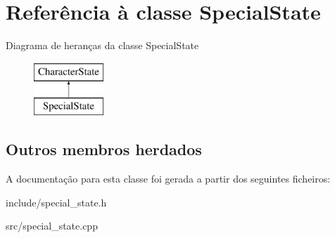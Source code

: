 \hypertarget{classSpecialState}{}\section{Referência à classe Special\+State}
\label{classSpecialState}
Diagrama de heranças da classe Special\+State\begin{figure}[H]
\begin{center}
\leavevmode
\includegraphics[height=2.000000cm]{classSpecialState}
\end{center}
\end{figure}
\subsection*{Outros membros herdados}


A documentação para esta classe foi gerada a partir dos seguintes ficheiros\+:\begin{DoxyCompactItemize}
\item 
include/special\+\_\+state.\+h\item 
src/special\+\_\+state.\+cpp\end{DoxyCompactItemize}
